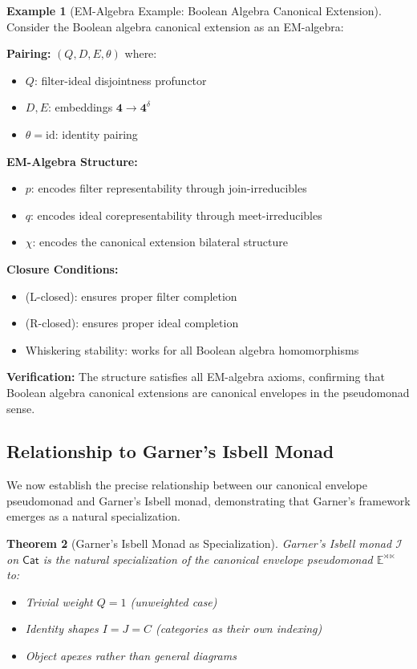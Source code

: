 \documentclass[11pt]{article}
\theoremstyle{plain}
\newtheorem{theorem}{Theorem}[section]
\theoremstyle{definition}
\newtheorem{example}[theorem]{Example}
\theoremstyle{remark}
\newcommand{\cat}[1]{\mathsf{#1}}
\newcommand{\id}{\mathrm{id}}
\begin{document}
\begin{example}[EM-Algebra Example: Boolean Algebra Canonical Extension]
Consider the Boolean algebra canonical extension as an EM-algebra:

\textbf{Pairing:} $(Q, D, E, \theta)$ where:
\begin{itemize}
\item $Q$: filter-ideal disjointness profunctor
\item $D, E$: embeddings $\mathbf{4} \to \mathbf{4}^{\delta}$
\item $\theta = \id$: identity pairing
\end{itemize}

\textbf{EM-Algebra Structure:}
\begin{itemize}
\item $p$: encodes filter representability through join-irreducibles
\item $q$: encodes ideal corepresentability through meet-irreducibles
\item $\chi$: encodes the canonical extension bilateral structure
\end{itemize}

\textbf{Closure Conditions:}
\begin{itemize}
\item (L-closed): ensures proper filter completion
\item (R-closed): ensures proper ideal completion
\item Whiskering stability: works for all Boolean algebra homomorphisms
\end{itemize}

\textbf{Verification:} The structure satisfies all EM-algebra axioms, confirming that Boolean algebra canonical extensions are canonical envelopes in the pseudomonad sense.
\end{example}

\subsection{Relationship to Garner's Isbell Monad}

We now establish the precise relationship between our canonical envelope pseudomonad and Garner's Isbell monad, demonstrating that Garner's framework emerges as a natural specialization.

\begin{theorem}[Garner's Isbell Monad as Specialization]
Garner's Isbell monad $\mathcal{I}$ on $\cat{Cat}$ is the natural specialization of the canonical envelope pseudomonad $\mathbb{E}^{\rtimes \ltimes}$ to:
\begin{itemize}
\item Trivial weight $Q = 1$ (unweighted case)
\item Identity shapes $I = J = C$ (categories as their own indexing)
\item Object apexes rather than general diagrams
\end{itemize}
\end{theorem}
\end{document}
